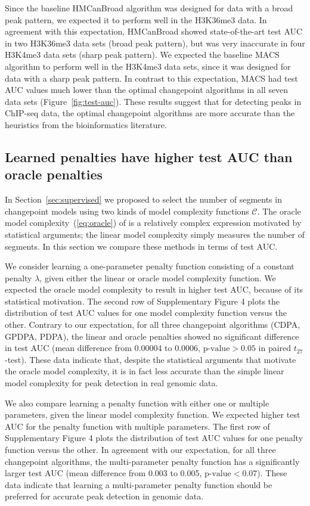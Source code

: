 \documentclass[twoside,11pt]{article}
\begin{document}
Since the baseline HMCanBroad algorithm was designed for data with a
broad peak pattern, we expected it to perform well in the H3K36me3
data. In agreement with this expectation, HMCanBroad showed
state-of-the-art test AUC in two H3K36me3 data sets (broad peak
pattern), but was very inaccurate in four H3K4me3 data sets (sharp
peak pattern). We expected the baseline MACS algorithm to perform well
in the H3K4me3 data sets, since it was designed for data with a sharp
peak pattern. In contrast to this expectation, MACS had test AUC
values much lower than the optimal changepoint algorithms in all seven data
sets (Figure~\ref{fig:test-auc}). These results suggest that for
detecting peaks in ChIP-seq data, the optimal changepoint algorithms are more
accurate than the heuristics from the bioinformatics literature.

\subsection{Learned penalties have higher test AUC than oracle
  penalties}

In Section~\ref{sec:supervised} we proposed to select the number of
segments in changepoint models using two kinds of model complexity
functions $\mathcal C$. The oracle model complexity~(\ref{eq:oracle})
of \citet{cleynen2013segmentation} is a relatively complex expression
 motivated by statistical arguments; the linear model complexity
simply measures the number of segments. In this section we compare
these methods in terms of test AUC.

We consider learning a one-parameter penalty function consisting of a
constant penalty $\lambda$, given either the linear or oracle model
complexity function. We expected the oracle model complexity to result
in higher test AUC, because of its statistical motivation. The second
row of Supplementary Figure 4 plots the distribution of test AUC
values for one model complexity function versus the other. Contrary to
our expectation, for all three changepoint algorithms (CDPA, GPDPA,
PDPA), the linear and oracle penalties showed no significant
difference in test AUC (mean difference from 0.00004 to 0.0006,
$\text{p-value}>0.05$ in paired $t_{27}$-test). These data indicate
that, despite the statistical arguments that motivate the oracle model
complexity, it is in fact less accurate than the simple linear model
complexity for peak detection in real genomic data.

We also compare learning a penalty function with either one or
multiple parameters, given the linear model complexity function. We
expected higher test AUC for the penalty function with multiple
parameters. The first row of Supplementary Figure 4 plots the
distribution of test AUC values for one penalty function versus the
other. In agreement with our expectation, for all three changepoint
algorithms, the multi-parameter penalty function has a significantly
larger test AUC (mean difference from 0.003 to 0.005,
$\text{p-value}<0.07$). These data indicate that learning a
multi-parameter penalty function should be preferred for accurate peak
detection in genomic data.
\end{document}

